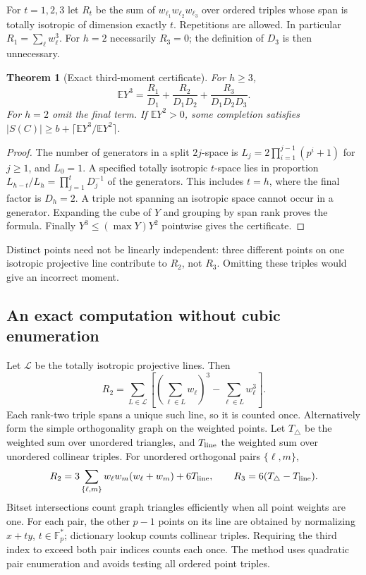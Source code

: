 \documentclass[11pt]{article}
\newtheorem{theorem}{Theorem}[section]
\begin{document}
For $t=1,2,3$ let $R_t$ be the sum of
$w_{\ell_1}w_{\ell_2}w_{\ell_3}$ over ordered triples whose span is
totally isotropic of dimension exactly $t$. Repetitions are allowed.
In particular $R_1=\sum_\ell w_\ell^3$. For $h=2$ necessarily
$R_3=0$; the definition of $D_3$ is then unnecessary.

\begin{theorem}[Exact third-moment certificate]
For $h\ge3$,
\[
 \mathbb E Y^3=\frac{R_1}{D_1}+
 \frac{R_2}{D_1D_2}+\frac{R_3}{D_1D_2D_3}.
\]
For $h=2$ omit the final term. If $\mathbb EY^2>0$, some completion
satisfies $|S(C)|\ge b+\lceil\mathbb EY^3/\mathbb EY^2\rceil$.
\end{theorem}
\begin{proof}
The number of generators in a split $2j$-space is
$L_j=2\prod_{i=1}^{j-1}(p^i+1)$ for $j\ge1$, and $L_0=1$.
A specified totally isotropic $t$-space lies in proportion
$L_{h-t}/L_h=\prod_{j=1}^tD_j^{-1}$ of the generators.
This includes $t=h$, where the final factor is $D_h=2$.
A triple not spanning an isotropic space cannot occur in a generator.
Expanding the cube of $Y$ and grouping by span rank proves the formula.
Finally $Y^3\le(\max Y)Y^2$ pointwise gives the certificate.
\end{proof}
Distinct points need not be linearly independent: three different
points on one isotropic projective line contribute to $R_2$, not
$R_3$. Omitting these triples would give an incorrect moment.

\subsection{An exact computation without cubic enumeration}
Let $\mathcal L$ be the totally isotropic projective lines. Then
\[
 R_2=\sum_{L\in\mathcal L}
 \left[\left(\sum_{\ell\in L}w_\ell\right)^3
              -\sum_{\ell\in L}w_\ell^3\right].
\]
Each rank-two triple spans a unique such line, so it is counted once.
Alternatively form the simple orthogonality graph on the weighted
points. Let $T_\triangle$ be the weighted sum over unordered triangles,
and $T_{\rm line}$ the weighted sum over unordered collinear triples.
For unordered orthogonal pairs $\{\ell,m\}$,
\[
 R_2=3\sum_{\{\ell,m\}}w_\ell w_m(w_\ell+w_m)+6T_{\rm line},
 \qquad R_3=6(T_\triangle-T_{\rm line}).
\]
Bitset intersections count graph triangles efficiently when all point
weights are one. For each pair, the other $p-1$ points on its line
are obtained by normalizing $x+ty$, $t\in\mathbb F_p^*$; dictionary
lookup counts collinear triples. Requiring the third index to exceed
both pair indices counts each once. The method uses quadratic pair
enumeration and avoids testing all ordered point triples.
\end{document}
